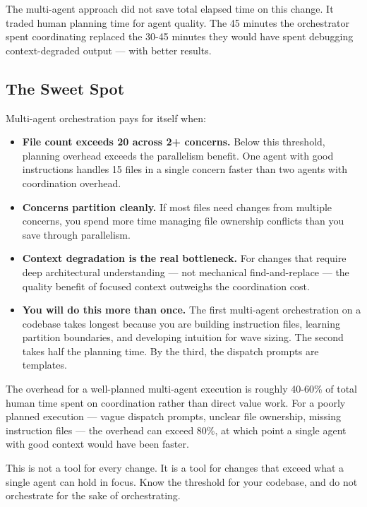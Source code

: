 \documentclass[
  a4paper,
  DIV=11,
  numbers=noendperiod]{scrreprt}
\providecommand{\tightlist}{%
  \setlength{\itemsep}{0pt}\setlength{\parskip}{0pt}}
\begin{document}
The multi-agent approach did not save total elapsed time on this change.
It traded human planning time for agent quality. The 45 minutes the
orchestrator spent coordinating replaced the 30-45 minutes they would
have spent debugging context-degraded output --- with better results.

\subsection{The Sweet Spot}\label{the-sweet-spot}

Multi-agent orchestration pays for itself when:

\begin{itemize}
\tightlist
\item
  \textbf{File count exceeds 20 across 2+ concerns.} Below this
  threshold, planning overhead exceeds the parallelism benefit. One
  agent with good instructions handles 15 files in a single concern
  faster than two agents with coordination overhead.
\item
  \textbf{Concerns partition cleanly.} If most files need changes from
  multiple concerns, you spend more time managing file ownership
  conflicts than you save through parallelism.
\item
  \textbf{Context degradation is the real bottleneck.} For changes that
  require deep architectural understanding --- not mechanical
  find-and-replace --- the quality benefit of focused context outweighs
  the coordination cost.
\item
  \textbf{You will do this more than once.} The first multi-agent
  orchestration on a codebase takes longest because you are building
  instruction files, learning partition boundaries, and developing
  intuition for wave sizing. The second takes half the planning time. By
  the third, the dispatch prompts are templates.
\end{itemize}

The overhead for a well-planned multi-agent execution is roughly 40-60\%
of total human time spent on coordination rather than direct value work.
For a poorly planned execution --- vague dispatch prompts, unclear file
ownership, missing instruction files --- the overhead can exceed 80\%,
at which point a single agent with good context would have been faster.

This is not a tool for every change. It is a tool for changes that
exceed what a single agent can hold in focus. Know the threshold for
your codebase, and do not orchestrate for the sake of orchestrating.
\end{document}
